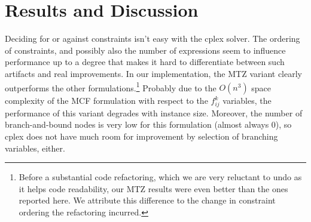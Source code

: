 \documentclass{article}
\begin{document}
\section{Results and Discussion}

Deciding for or against constraints isn't easy with the cplex solver. The ordering of constraints, and possibly also the number of expressions seem to influence performance up to a degree that makes it hard to differentiate between such artifacts and real improvements. 
In our implementation, the MTZ variant clearly outperforms the other formulations.\footnote{Before a substantial code refactoring, which we are very reluctant to undo as it helps code readability, our MTZ results were even better than the ones reported here. We attribute this difference to the change in constraint ordering the refactoring incurred.} 
Probably due to the $O(n^3)$ space complexity of the MCF formulation with respect to the $f^k_{ij}$ variables, the performance of this variant degrades with instance size. Moreover, the number of branch-and-bound nodes is very low for this formulation (almost always 0), so cplex does not have much room for improvement by selection of branching variables, either.

\end{document}
